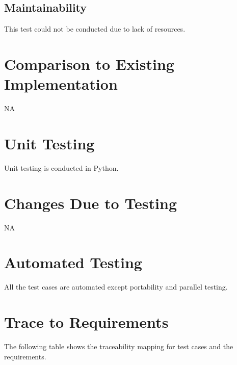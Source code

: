 \documentclass[12pt, titlepage]{article}
\begin{document}
\subsection{Maintainability}

This test could not be conducted due to lack of resources. 
	
\section{Comparison to Existing Implementation}	

NA

\section{Unit Testing} Unit testing is conducted in Python.

\section{Changes Due to Testing} NA

\section{Automated Testing} All the test cases are automated except 
portability and parallel testing.
		
\section{Trace to Requirements} 


The following table shows the traceability mapping for test cases and the 
requirements. 
\end{document}
